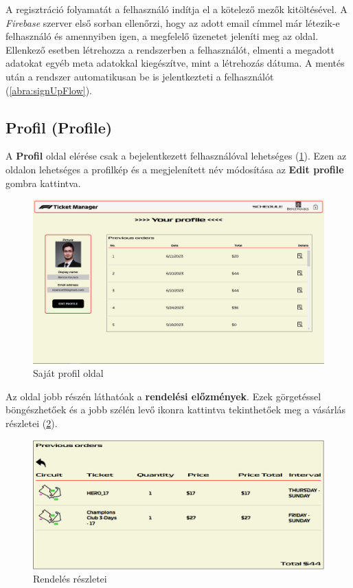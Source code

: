 A regisztráció folyamatát a felhasználó indítja el a kötelező mezők kitöltésével. A \textit{Firebase} szerver első sorban ellenőrzi, hogy az adott email címmel már létezik-e felhasználó és amennyiben igen, a megfelelő üzenetet jeleníti meg az oldal. Ellenkező esetben létrehozza a rendszerben a felhasználót, elmenti a megadott adatokat egyéb meta adatokkal kiegészítve, mint a létrehozás dátuma. A mentés után a rendszer automatikusan be is jelentkezteti a felhasználót (\ref{abra:signUpFlow}).

\subsection {Profil (Profile)}

A \textbf{Profil} oldal elérése csak a bejelentkezett felhasználóval lehetséges (\ref{abra:profile}). Ezen az oldalon lehetséges a profilkép és a megjelenített név módosítása az \textbf{Edit profile} gombra kattintva.

\begin{figure}[!h]
	\centering
	\includegraphics[scale=0.2]{images/profile}
	\caption{Saját profil oldal}
	\label{abra:profile}
\end{figure}

Az oldal jobb részén láthatóak a \textbf{rendelési előzmények}. Ezek görgetéssel böngészhetőek és a jobb szélén levő ikonra kattintva tekinthetőek meg a vásárlás részletei (\ref{abra:previousOrders}).

\begin{figure}[!h]
	\centering
	\includegraphics[scale=0.3]{images/previousOrders}
	\caption{Rendelés részletei}
	\label{abra:previousOrders}
\end{figure}

